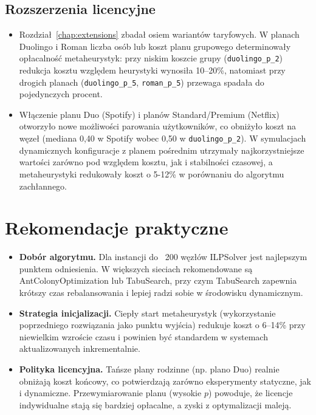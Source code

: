 {\subsection*{Rozszerzenia licencyjne}
\begin{itemize}
  \item Rozdział~\ref{chap:extensions} zbadał osiem wariantów taryfowych. W planach Duolingo i Roman liczba osób lub koszt planu grupowego determinowały opłacalność metaheurystyk: przy niskim koszcie grupy (\texttt{duolingo\_p\_2}) redukcja kosztu względem heurystyki wynosiła 10--20\%, natomiast przy drogich planach (\texttt{duolingo\_p\_5}, \texttt{roman\_p\_5}) przewaga spadała do pojedynczych procent.
  \item Włączenie planu Duo (Spotify) i planów Standard/Premium (Netflix) otworzyło nowe możliwości parowania użytkowników, co obniżyło koszt na węzeł (mediana 0,40 w Spotify wobec 0,50 w \texttt{duolingo\_p\_2}). W symulacjach dynamicznych konfiguracje z planem pośrednim utrzymały najkorzystniejsze wartości zarówno pod względem kosztu, jak i stabilności czasowej, a metaheurystyki redukowały koszt o 5-12\% w porównaniu do algorytmu zachłannego.
\end{itemize}

\section{Rekomendacje praktyczne}

\begin{itemize}
  \item \textbf{Dobór algorytmu.} Dla instancji do ~200 węzłów ILPSolver jest najlepszym punktem odniesienia. W większych sieciach rekomendowane są AntColonyOptimization lub TabuSearch, przy czym TabuSearch zapewnia krótszy czas rebalansowania i lepiej radzi sobie w środowisku dynamicznym.
  \item \textbf{Strategia inicjalizacji.} Ciepły start metaheurystyk (wykorzystanie poprzedniego rozwiązania jako punktu wyjścia) redukuje koszt o 6--14\% przy niewielkim wzroście czasu i powinien być standardem w systemach aktualizowanych inkrementalnie.
  \item \textbf{Polityka licencyjna.} Tańsze plany rodzinne (np. plano Duo) realnie obniżają koszt końcowy, co potwierdzają zarówno eksperymenty statyczne, jak i dynamiczne. Przewymiarowanie planu (wysokie $p$) powoduje, że licencje indywidualne stają się bardziej opłacalne, a zyski z optymalizacji maleją.
\end{itemize}

}
